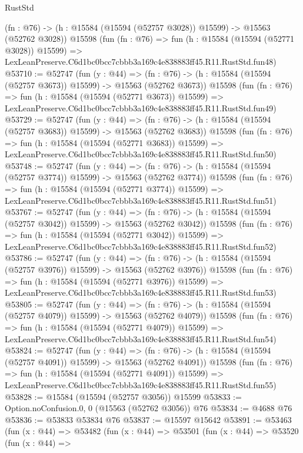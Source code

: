 \begin{lexlean}{RustStd}
\begin{coremodule}
    (fn : @76) -> (h : @15584 (@15594 (@52757 @3028)) @15599) -> @15563 (@52762 @3028))
    @15598
    (fun (fn : @76) =>
    fun (h : @15584 (@15594 (@52771 @3028)) @15599) =>
    LexLeanPreserve.C6d1bc0bcc7cbbb3a169c4e838883ff45.R11.RustStd.fun48)
@53710 := @52747
    (fun (y : @44) =>
    (fn : @76) -> (h : @15584 (@15594 (@52757 @3673)) @15599) -> @15563 (@52762 @3673))
    @15598
    (fun (fn : @76) =>
    fun (h : @15584 (@15594 (@52771 @3673)) @15599) =>
    LexLeanPreserve.C6d1bc0bcc7cbbb3a169c4e838883ff45.R11.RustStd.fun49)
@53729 := @52747
    (fun (y : @44) =>
    (fn : @76) -> (h : @15584 (@15594 (@52757 @3683)) @15599) -> @15563 (@52762 @3683))
    @15598
    (fun (fn : @76) =>
    fun (h : @15584 (@15594 (@52771 @3683)) @15599) =>
    LexLeanPreserve.C6d1bc0bcc7cbbb3a169c4e838883ff45.R11.RustStd.fun50)
@53748 := @52747
    (fun (y : @44) =>
    (fn : @76) -> (h : @15584 (@15594 (@52757 @3774)) @15599) -> @15563 (@52762 @3774))
    @15598
    (fun (fn : @76) =>
    fun (h : @15584 (@15594 (@52771 @3774)) @15599) =>
    LexLeanPreserve.C6d1bc0bcc7cbbb3a169c4e838883ff45.R11.RustStd.fun51)
@53767 := @52747
    (fun (y : @44) =>
    (fn : @76) -> (h : @15584 (@15594 (@52757 @3042)) @15599) -> @15563 (@52762 @3042))
    @15598
    (fun (fn : @76) =>
    fun (h : @15584 (@15594 (@52771 @3042)) @15599) =>
    LexLeanPreserve.C6d1bc0bcc7cbbb3a169c4e838883ff45.R11.RustStd.fun52)
@53786 := @52747
    (fun (y : @44) =>
    (fn : @76) -> (h : @15584 (@15594 (@52757 @3976)) @15599) -> @15563 (@52762 @3976))
    @15598
    (fun (fn : @76) =>
    fun (h : @15584 (@15594 (@52771 @3976)) @15599) =>
    LexLeanPreserve.C6d1bc0bcc7cbbb3a169c4e838883ff45.R11.RustStd.fun53)
@53805 := @52747
    (fun (y : @44) =>
    (fn : @76) -> (h : @15584 (@15594 (@52757 @4079)) @15599) -> @15563 (@52762 @4079))
    @15598
    (fun (fn : @76) =>
    fun (h : @15584 (@15594 (@52771 @4079)) @15599) =>
    LexLeanPreserve.C6d1bc0bcc7cbbb3a169c4e838883ff45.R11.RustStd.fun54)
@53824 := @52747
    (fun (y : @44) =>
    (fn : @76) -> (h : @15584 (@15594 (@52757 @4091)) @15599) -> @15563 (@52762 @4091))
    @15598
    (fun (fn : @76) =>
    fun (h : @15584 (@15594 (@52771 @4091)) @15599) =>
    LexLeanPreserve.C6d1bc0bcc7cbbb3a169c4e838883ff45.R11.RustStd.fun55)
@53828 := @15584 (@15594 (@52757 @3056)) @15599
@53833 := Option.noConfusion.{0, 0} (@15563 (@52762 @3056)) @76
@53834 := @4688 @76
@53836 := @53833 @53834 @76
@53837 := @15597 @15642
@53891 := @53463
    (fun (x : @44) =>
    @53482
      (fun (x : @44) =>
      @53501
        (fun (x : @44) =>
        @53520
          (fun (x : @44) =>

\end{coremodule}
\end{lexlean}
